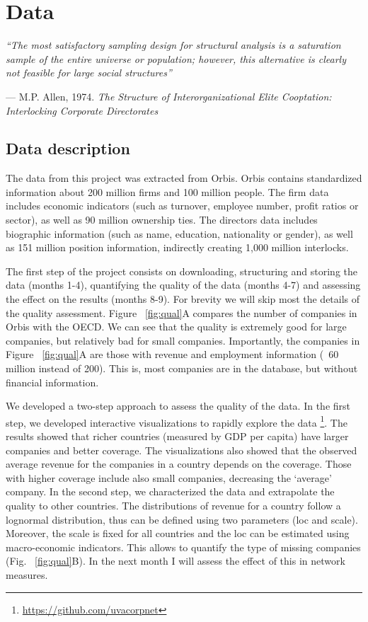 \section{Data}
\label{sec:data}
\textit{``The most satisfactory sampling design for structural analysis is a saturation sample of the entire universe or population; 
however, this alternative is clearly not feasible for large social structures'' 
}
\begin{flushright}
--- M.P. Allen, 1974. \textit{The Structure of Interorganizational Elite Cooptation: Interlocking Corporate Directorates}
\end{flushright}

\subsection{Data description}
The data from this project was extracted from Orbis.
Orbis contains standardized information about 200 million firms and 100 million people. 
The firm data includes economic indicators (such as turnover, employee number, profit ratios or sector),
as well as 90 million ownership ties.
The directors data includes biographic information (such as name, education, nationality or gender), 
as well as 151 million position information,
indirectly creating 1,000 million interlocks.

The first step of the project consists on downloading, structuring and storing the data (months 1-4), quantifying the quality of the data (months 4-7) and assessing the effect on the results (months 8-9). For brevity we will skip most the details of the quality assessment. Figure ~\ref{fig:qual}A compares the number of companies in Orbis with the OECD. We can see that the quality is extremely good for large companies, but relatively bad for small companies. Importantly, the companies in Figure ~\ref{fig:qual}A are those with revenue and employment information (~60 million instead of 200). This is, most companies are in the database, but without financial information. 

We developed a two-step approach to assess the quality of the data. In the first step, we developed interactive visualizations to rapidly explore the data \footnote{\url{https://github.com/uvacorpnet}}. The results showed that richer countries (measured by GDP per capita) have larger companies and better coverage. The visualizations also showed that the observed average revenue for the companies in a country depends on the coverage. Those with higher coverage include also small companies, decreasing the `average' company. In the second step, we characterized the data and extrapolate the quality to other countries. The distributions of revenue for a country follow a lognormal distribution, thus can be defined using two parameters (loc and scale). Moreover, the scale is fixed for all countries and the loc can be estimated using macro-economic indicators. This allows to quantify the type of missing companies (Fig. ~\ref{fig:qual}B). In the next month I will assess the effect of this in network measures.

